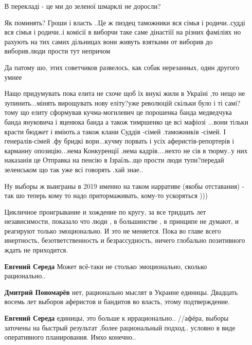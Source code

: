\begin{itemize}

В перекладі - це ми до зеленої шмарклі не доросли?


Як поминять? Гроши і власть ..Це ж пиздец таможники вся сімья і родичи..судді
вся сімья і родичи..і комісії в виборчи таке саме дінастіїї на різних фаміліях
но рахують на тих самих дільницах вони живуть взятками от виборив до
виборив.люди прости тут непричом


Да патому шо, этих советчиков развелось, как собак нерезанных, один другого умнее


Нащо придумувать пока елита не схоче щоб їх внукі жили в Україні ,то нещо не
зупинить...мінять вирощувать нову еліту?уже революцій скільки було і ті
самі?тому що елиту сформував кучма-могилевич це порошенка банда медведчука
банда януковича і яценюка банда а також тимршенко це всі мафіозі ...вони тільки
красти бюджет і вміють.а також клани Суддів -сімей .таможників -сімей. І
генералів-сімей .фу бридкі вори...кучму порвать і усіх аферистів-репортерів і
карманну опозицію...нема Конкуренції .нема кадрів....нехто не сів в тюрму..у
них наказанія це Отправка на пенсію в Ізраїль..що прости люди тупи?передай
зеленськом що так уже всі говорять .хай знае..


Ну выборы ж выиграны в 2019 именно на таком нарративе (якобы отставания) - так
шо теперь кому то надо притормаживать, кому-то ускоряться )))


Цикличное проигрывание и хождение по кругу, за все тридцать лет независимости,
показало что люди , в большинстве , в принципе не думают, и реагируют только
эмоционально. И это не меняется. Пока во главе всего инертность,
безответственность и безрассудность, ничего глобально позитивного ждать не
приходится.

\begin{itemize}
\textbf{Евгений Середа} Может всё-таки не столько эмоционально, сколько рационально..

\textbf{Дмитрий Пономарёв} нет, рационально мыслят в Украине единицы. Двадцать
восемь лет выборов аферистов и бандитов во власть, этому подтверждение.

\textbf{Евгений Середа} единицы, это больше к иррационально.. //афёра, выборы
заточены на быстрый результат ,более рациональный подход.. условно в виде
оперативного планирования. Имхо конечно..
\end{itemize}


\end{itemize}

